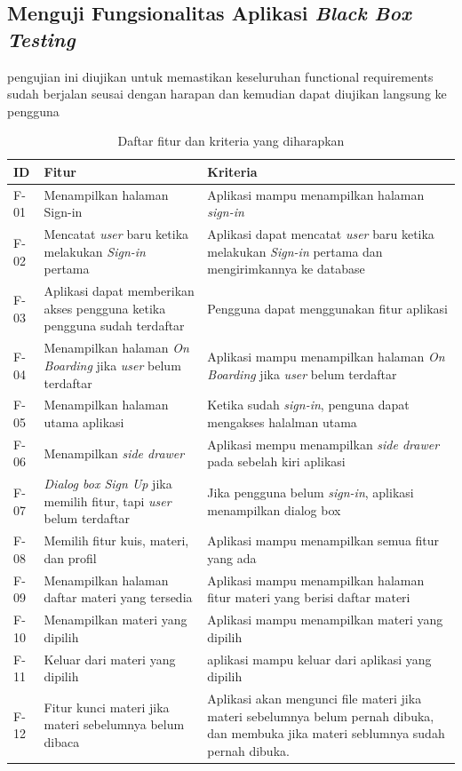 \subsection{Menguji Fungsionalitas Aplikasi \textit{Black Box Testing}}
pengujian ini diujikan untuk memastikan keseluruhan functional requirements sudah berjalan seusai dengan harapan dan kemudian dapat diujikan langsung ke pengguna
\begin{table}[H]
	\centering
	\caption{Daftar fitur dan kriteria yang diharapkan}
	\begin{tabular}{|m{1cm}|p{}|p{}|}
		\hline
		\centering\textbf{ID} & \centering\textbf{Fitur} & \multicolumn{1}{m{0.45\textwidth}|}{\centering \textbf{Kriteria}} \\
		\hline
		F-01 &Menampilkan halaman Sign-in & Aplikasi mampu menampilkan halaman \textit{sign-in} \\
		\hline
		F-02 &Mencatat \textit{user} baru ketika melakukan \textit{Sign-in} pertama & Aplikasi dapat mencatat \textit{user} baru ketika melakukan \textit{Sign-in} pertama dan mengirimkannya ke database\\
		\hline
		F-03 &Aplikasi dapat memberikan akses pengguna ketika pengguna sudah terdaftar& Pengguna dapat menggunakan fitur aplikasi\\
		\hline
		F-04 &Menampilkan halaman \textit{On Boarding} jika \textit{user} belum terdaftar & Aplikasi mampu menampilkan halaman \textit{On Boarding} jika \textit{user} belum terdaftar  \\
		\hline
		F-05&Menampilkan halaman utama aplikasi& Ketika sudah \textit{sign-in}, penguna dapat mengakses halalman utama \\
		\hline
		F-06&Menampilkan \textit{side drawer}& Aplikasi mempu menampilkan \textit{side drawer} pada sebelah kiri aplikasi\\
		\hline
		F-07&\textit{Dialog box Sign Up} jika memilih fitur, tapi \textit{user} belum terdaftar& Jika pengguna belum \textit{sign-in}, aplikasi menampilkan dialog box \\
		\hline
		F-08&Memilih fitur kuis, materi, dan profil& Aplikasi mampu menampilkan semua fitur yang ada\\
		\hline
		F-09 &Menampilkan halaman daftar materi yang tersedia& Aplikasi mampu menampilkan halaman fitur materi yang berisi daftar materi \\
		\hline
		F-10&Menampilkan materi yang dipilih & Aplikasi mampu menampilkan materi yang dipilih\\
		\hline
		F-11&Keluar dari materi yang dipilih& aplikasi mampu keluar dari aplikasi yang dipilih\\
		\hline
		F-12&Fitur kunci materi jika materi sebelumnya belum dibaca& Aplikasi akan mengunci file materi jika materi sebelumnya belum pernah dibuka, dan membuka jika materi seblumnya sudah pernah dibuka. \\
		\hline
	\end{tabular}
\end{table}
